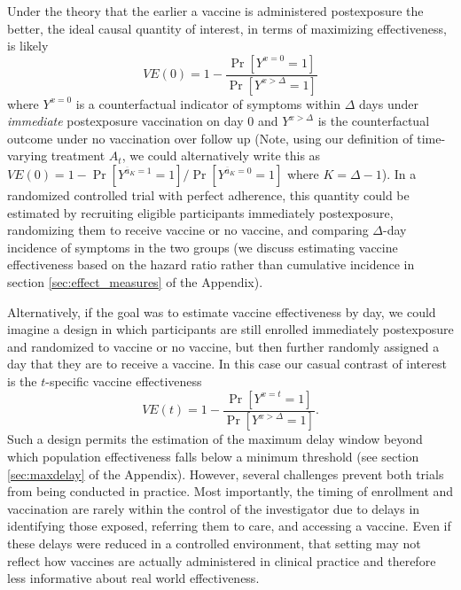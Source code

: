 \documentclass[11pt]{article}
\begin{document}
Under the theory that the earlier a vaccine is administered postexposure the better, the ideal causal quantity of interest, in terms of maximizing effectiveness, is likely
$$VE(0) = 1 - \frac{\Pr[Y^{x = 0} = 1]}{\Pr[Y^{x > \Delta} = 1]}$$
where $Y^{x = 0}$ is a counterfactual indicator of symptoms within $\Delta$ days under \textit{immediate} postexposure vaccination on day 0 and $Y^{x > \Delta}$ is the counterfactual outcome under no vaccination over follow up (Note, using our definition of time-varying treatment $A_t$, we could alternatively write this as $VE(0) = 1 - \Pr[Y^{\overline{a}_{K} = 1} = 1]/\Pr[Y^{\overline{a}_{K} = 0} = 1]$ where $K = \Delta - 1$). In a randomized controlled trial with perfect adherence, this quantity could be estimated by recruiting eligible participants immediately postexposure, randomizing them to receive vaccine or no vaccine, and comparing $\Delta$-day incidence of symptoms in the two groups (we discuss estimating vaccine effectiveness based on the hazard ratio rather than cumulative incidence in section \ref{sec:effect_measures} of the Appendix). 

Alternatively, if the goal was to estimate vaccine effectiveness by day, we could imagine a design in which participants are still enrolled immediately postexposure and randomized to vaccine or no vaccine, but then further randomly assigned a day that they are to receive a vaccine. In this case our casual contrast of interest is the $t$-specific vaccine effectiveness
$$VE(t) = 1 - \frac{\Pr[Y^{x = t} = 1]}{\Pr[Y^{x > \Delta} = 1]}.$$
Such a design permits the estimation of the maximum delay window beyond which population effectiveness falls below a minimum threshold (see section \ref{sec:maxdelay} of the Appendix). However, several challenges prevent both trials from being conducted in practice. Most importantly, the timing of enrollment and vaccination are rarely within the control of the investigator due to delays in identifying those exposed, referring them to care, and accessing a vaccine. Even if these delays were reduced in a controlled environment, that setting may not reflect how vaccines are actually administered in clinical practice and therefore less informative about real world effectiveness.
\end{document}
